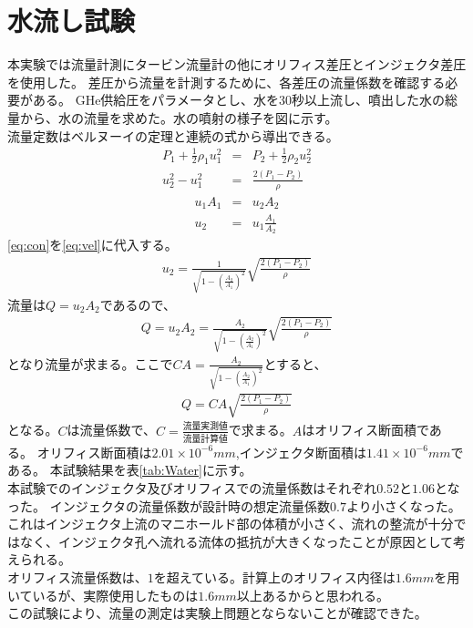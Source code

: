 \section{水流し試験}
本実験では流量計測にタービン流量計の他にオリフィス差圧とインジェクタ差圧を使用した。
差圧から流量を計測するために、各差圧の流量係数を確認する必要がある。
GHe供給圧をパラメータとし、水を30秒以上流し、噴出した水の総量から、水の流量を求めた。水の噴射の様子を図に示す。
\\
流量定数はベルヌーイの定理と連続の式から導出できる。
\begin{eqnarray}
P_{1} + \frac{1}{2} \rho_{1} u^2_{1} &=& P_{2} + \frac{1}{2} \rho_{2} u^2_{2}  \nonumber \\
u^2_{2} - u^2_{1} &=& \frac{2(P_{1}-P_{2})}{\rho} 
\label{eq:vel}
\end{eqnarray}
\begin{eqnarray}
u_{1}A_{1} &=& u_{2}A_{2}  \nonumber \\
u_{2} &=& u_{1}\frac{A_{1}}{A_{2}}
\label{eq:con}
\end{eqnarray}
\ref{eq:con}を\ref{eq:vel}に代入する。
\begin{eqnarray}
u_{2}=\frac{1}{\sqrt{1-(\frac{A_{2}}{A_{1}})^2}}\sqrt{\frac{2(P_{1}-P_{2})}{\rho}}
\label{eq:Velocity}
\end{eqnarray}
流量は$Q=u_{2}A_{2}$であるので、
\begin{eqnarray}
Q=u_{2}A_{2}=\frac{A_{2}}{\sqrt{1-(\frac{A_{2}}{A_{1}})^2}}\sqrt{\frac{2(P_{1}-P_{2})}{\rho}}
\label{eq:VFlux}
\end{eqnarray}
となり流量が求まる。ここで$CA=\frac{A_{2}}{\sqrt{1-(\frac{A_{2}}{A_{1}})^2}}$とすると、
\begin{eqnarray}
Q=CA\sqrt{\frac{2(P_{1}-P_{2})}{\rho}}
\label{eq:IdealFlux}
\end{eqnarray}
となる。$C$は流量係数で、$C=\frac{流量実測値}{流量計算値}$で求まる。$A$はオリフィス断面積である。
オリフィス断面積は$2.01 \times 10^{-6}mm$,インジェクタ断面積は$1.41 \times 10^{-6}mm$である。
本試験結果を表\ref{tab:Water}に示す。
\\
本試験でのインジェクタ及びオリフィスでの流量係数はそれぞれ$0.52$と$1.06$となった。
インジェクタの流量係数が設計時の想定流量係数$0.7$より小さくなった。
これはインジェクタ上流のマニホールド部の体積が小さく、流れの整流が十分ではなく、インジェクタ孔へ流れる流体の抵抗が大きくなったことが原因として考えられる。
\\
オリフィス流量係数は、$1$を超えている。計算上のオリフィス内径は$1.6mm$を用いているが、実際使用したものは$1.6mm$以上あるからと思われる。
\\
この試験により、流量の測定は実験上問題とならないことが確認できた。
